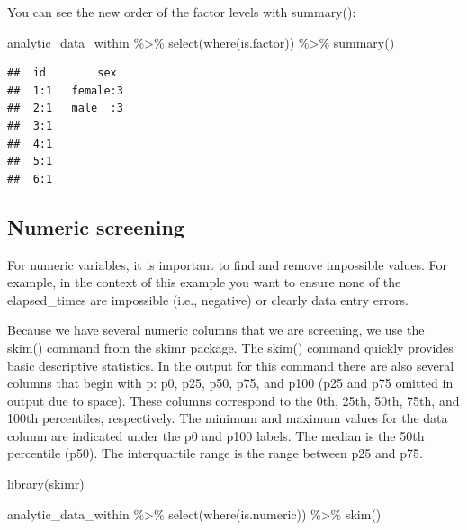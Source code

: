 \documentclass[
]{krantz}
\makeatletter
\newenvironment{Shaded}{\begin{snugshade}}{\end{snugshade}}
\newcommand{\FunctionTok}[1]{\textcolor[rgb]{0,0,0}{#1}}
\newcommand{\NormalTok}[1]{#1}
\newcommand{\SpecialCharTok}[1]{\textcolor[rgb]{0,0,0}{#1}}
\newenvironment{kframe}{%
\medskip{}
\setlength{\fboxsep}{.8em}
 \def\at@end@of@kframe{}%
 \ifinner\ifhmode%
  \def\at@end@of@kframe{\end{minipage}}%
  \begin{minipage}{\columnwidth}%
 \fi\fi%
 \def\FrameCommand##1{\hskip\@totalleftmargin \hskip-\fboxsep
 \colorbox{shadecolor}{##1}\hskip-\fboxsep
     \hskip-\linewidth \hskip-\@totalleftmargin \hskip\columnwidth}%
 \MakeFramed {\advance\hsize-\width
   \@totalleftmargin\z@ \linewidth\hsize
   \@setminipage}}%
 {\par\unskip\endMakeFramed%
 \at@end@of@kframe}
\renewenvironment{Shaded}{\begin{kframe}}{\end{kframe}}
\makeatother
\begin{document}
You can see the new order of the factor levels with summary():

\begin{Shaded}
\begin{Highlighting}[]
\NormalTok{analytic\_data\_within }\SpecialCharTok{\%\textgreater{}\%}
  \FunctionTok{select}\NormalTok{(}\FunctionTok{where}\NormalTok{(is.factor)) }\SpecialCharTok{\%\textgreater{}\%}
  \FunctionTok{summary}\NormalTok{()}
\end{Highlighting}
\end{Shaded}

\begin{verbatim}
##  id        sex   
##  1:1   female:3  
##  2:1   male  :3  
##  3:1             
##  4:1             
##  5:1             
##  6:1
\end{verbatim}

\hypertarget{numeric-screening-1}{%
\subsection{Numeric screening}\label{numeric-screening-1}}

For numeric variables, it is important to find and remove impossible values. For example, in the context of this example you want to ensure none of the elapsed\_times are impossible (i.e., negative) or clearly data entry errors.

Because we have several numeric columns that we are screening, we use the skim() command from the skimr package. The skim() command quickly provides basic descriptive statistics. In the output for this command there are also several columns that begin with p: p0, p25, p50, p75, and p100 (p25 and p75 omitted in output due to space). These columns correspond to the 0th, 25th, 50th, 75th, and 100th percentiles, respectively. The minimum and maximum values for the data column are indicated under the p0 and p100 labels. The median is the 50th percentile (p50). The interquartile range is the range between p25 and p75.

\begin{Shaded}
\begin{Highlighting}[]
\FunctionTok{library}\NormalTok{(skimr)}

\NormalTok{analytic\_data\_within }\SpecialCharTok{\%\textgreater{}\%}
  \FunctionTok{select}\NormalTok{(}\FunctionTok{where}\NormalTok{(is.numeric)) }\SpecialCharTok{\%\textgreater{}\%}
  \FunctionTok{skim}\NormalTok{()}
\end{Highlighting}
\end{Shaded}
\end{document}

